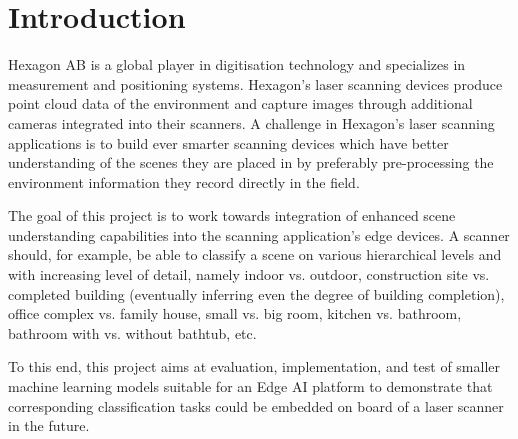 \chapter{Introduction}
Hexagon AB\cite{hexagon} is a global player in digitisation technology and specializes in measurement and positioning systems.
Hexagon’s laser scanning devices produce point cloud data of the environment and capture images through additional cameras integrated into their scanners.
A challenge in Hexagon’s laser scanning applications is to build ever smarter scanning devices which have better understanding of the scenes they are placed in by preferably pre-processing the environment
information they record directly in the field.

The goal of this project is to work towards integration of enhanced scene understanding capabilities into the scanning application’s edge devices.
A scanner should, for example, be able to classify a scene on various hierarchical levels and with increasing level of detail, namely indoor vs. outdoor, construction site 
vs. completed building (eventually inferring even the degree of building completion), office complex vs.
family house, small vs. big room, kitchen vs. bathroom, bathroom with vs. without bathtub, etc.

To this end, this project aims at evaluation, implementation, and test of smaller machine learning models
suitable for an Edge AI platform to demonstrate that corresponding classification tasks
could be embedded on board of a laser scanner in the future.